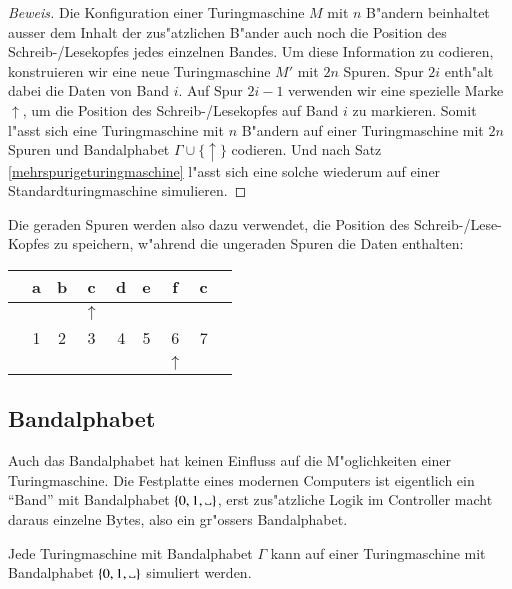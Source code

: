 \begin{proof}[Beweis]
Die Konfiguration einer Turingmaschine $M$ mit $n$ B"andern beinhaltet
ausser dem Inhalt der zus"atzlichen B"ander auch noch die Position
des Schreib-/Lesekopfes jedes einzelnen Bandes. Um diese Information
zu codieren, konstruieren wir eine neue Turingmaschine $M'$ mit
$2n$ Spuren. Spur $2i$ enth"alt dabei die Daten von Band $i$.
Auf Spur $2i-1$ verwenden wir eine spezielle Marke $\uparrow$, um die Position
des Schreib-/Lesekopfes auf Band $i$ zu markieren. Somit l"asst sich
eine Turingmaschine mit $n$ B"andern auf einer Turingmaschine mit
$2n$ Spuren und Bandalphabet $\Gamma\cup\{\uparrow\}$ codieren.
Und nach Satz \ref{mehrspurigeturingmaschine} l"asst sich eine solche wiederum
auf einer Standardturingmaschine simulieren.
\end{proof}
Die geraden Spuren werden also dazu verwendet, die Position des
Schreib-/Lese-Kopfes zu speichern, w"ahrend die ungeraden Spuren
die Daten enthalten: 
\begin{center}
\begin{tabular}{c|c|c|c|c|c|c|c|c}
\hline
&a&b&c&d&e&f&c&\\
\hline
& & &$\uparrow$& & & & &\\
\hline
&1&2&3&4&5&6&7&\\
\hline
& & & & & &$\uparrow$& &\\
\hline
\end{tabular}
\end{center}

\subsection{Bandalphabet}
Auch das Bandalphabet hat keinen Einfluss auf die M"oglichkeiten einer
Turingmaschine. Die Festplatte eines modernen Computers ist eigentlich
ein ``Band'' mit Bandalphabet $\{0,1,\blank\}$, erst zus"atzliche
Logik im Controller macht daraus einzelne Bytes, also ein gr"ossers
Bandalphabet.

\begin{satz}
Jede Turingmaschine mit Bandalphabet $\Gamma$ kann auf einer Turingmaschine
mit Bandalphabet $\{0,1,\blank\}$ simuliert werden.
\end{satz}

